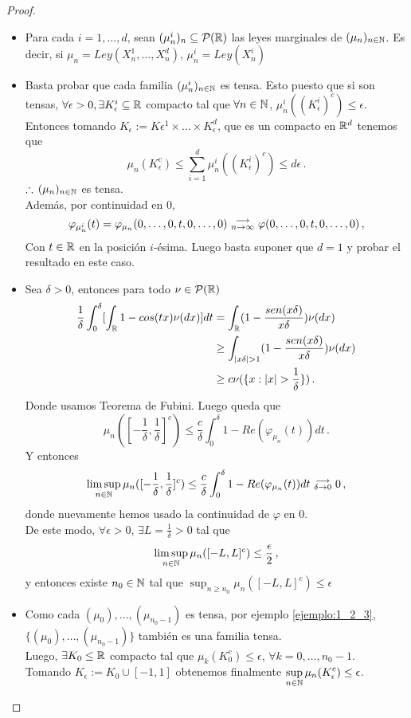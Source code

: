 \begin{proof}
\gris
\beforeitemize
\begin{itemize}
    \item Para cada $i=1,\dots,d$, sean $(\mu_n^i)_n\subseteq \mathcal{P}(\mathbb{R})$ las leyes marginales de $(\mu_n)_{n\in\mathbb{N}}$. Es decir, si $\mu_n=Ley(X_n^1,\dots,X_n^d)$, $\mu_n^i=Ley(X_n^i)$
    \item Basta probar que cada familia $(\mu_n^i)_{n\in\mathbb{N}}$ es tensa.
    Esto puesto que si son tensas, $\forall \epsilon>0, \exists K_\epsilon^i\subseteq\mathbb{R}$ compacto tal que $\forall n\in\mathbb{N}$, $\mu_n^i((K_\epsilon^i)^c)\leq\epsilon$. Entonces tomando $K_\epsilon:=K\epsilon^1\times\dots\times K_\epsilon^d$, que es un compacto en $\mathbb{R}^d$ tenemos que
    $$ \mu_n(K^c_\epsilon)\leq \displaystyle\sum^d_{i=1}\mu_n^i((K_\epsilon^i)^c)\leq d \epsilon \, .$$
    $\therefore \, (\mu_n)_{n\in\mathbb{N}}$ es tensa. 
    \\ Además, por continuidad en $0$, $$\varphi_{\mu_n^i}(t)=\varphi_{\mu_n}(0,\dots,0,t,0,\dots,0)\mbox{ }\substack{\longrightarrow \\ n\to\infty}\mbox{ } \varphi(0,\dots,0,t,0,\dots,0)\, ,$$
    Con $t\in\mathbb{R}$ en la posición $i$-ésima. Luego basta suponer que $d=1$ y probar el resultado en este caso.
    \item Sea $\delta>0$, entonces para todo $\nu\in\mathcal{P}(\mathbb{R})$
    \begin{alignat*}{2}
        \displaystyle \frac{1}{\delta}\int^\delta_0 [\int_\R 1-cos(tx)\nu(dx)]dt & = \int_\R(1-\frac{sen(x\delta)}{x\delta})\nu(dx) \\
         & \geq  \int_{|x\delta|>1}(1-\frac{sen(x\delta)}{x\delta})\nu(dx) \\
         & \geq c\nu(\{x:|x|>\frac{1}{\delta}\}) \, .
    \end{alignat*}
    Donde usamos Teorema de Fubini. Luego queda que
    $$ \displaystyle \mu_n([-\frac{1}{\delta},\frac{1}{\delta}]^c)\leq \frac{c}{\delta}\int^\delta_0 1-Re(\varphi_{\mu_n}(t))dt \, .$$
    Y entonces
    $$ \displaystyle \limsup_{n\in\mathbb{N}} \mu_n([-\frac{1}{\delta},\frac{1}{\delta}]^c)\leq \frac{c}{\delta}\int^\delta_0 1-Re(\varphi_{\mu_n}(t))dt\mbox{ }\substack{\longrightarrow \\ \delta\to0}\mbox{ }0 \, ,$$
    donde nuevamente hemos usado la continuidad de $\varphi$ en $0$.
    \\ De este modo, $\forall \epsilon>0$, $\exists L=\frac{1}{\delta}>0$ tal que 
    $$ \limsup_{n\in\mathbb{N}} \mu_n([-L,L]^c)\leq \frac{\epsilon}{2} \, ,$$
    y entonces existe $n_0\in\mathbb{N}$ tal que $\displaystyle \sup_{n\geq n_0}\mu_n([-L,L]^c)\leq \epsilon$
    \item Como cada $(\mu_0),\dots,(\mu_{n_0-1})$ es tensa, por ejemplo \ref{ejemplo:1_2_3}, $\{(\mu_0),\dots,(\mu_{n_0-1})\}$ también es una familia tensa.
    \\ Luego, $\exists K_0\leq \mathbb{R}$ compacto tal que $\mu_k(K_0^c)\leq\epsilon$, $\forall k = 0,\dots,n_0-1$.
    \\ Tomando $K_\epsilon:=K_0\cup [-1,1]$ obtenemos finalmente $\displaystyle\sup_{n\in\mathbb{N}}\mu_n(K_\epsilon^c)\leq \epsilon$.
\end{itemize}
\findem
\negro
\end{proof}


